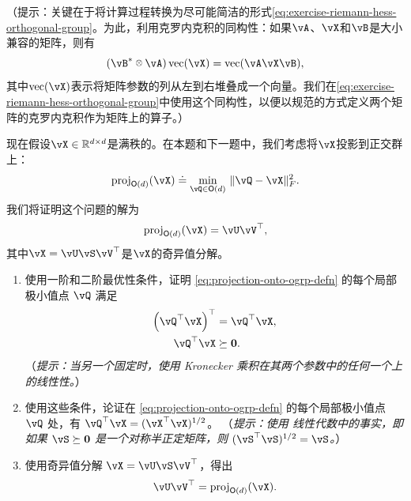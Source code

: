 \documentclass[../../book-main_zh.tex]{subfiles}
\begin{document}
（提示：关键在于将计算过程转换为尽可能简洁的形式\eqref{eq:exercise-riemann-hess-orthogonal-group}。为此，利用克罗内克积的同构性：如果$\vA$、$\vX$和$\vB$是大小兼容的矩阵，则有
        \begin{equation*}
            (\vB\adj \kron \vA) \Vec(\vX) = \Vec(\vA \vX \vB),
        \end{equation*}
        其中$\Vec(\vX)$表示将矩阵参数的列从左到右堆叠成一个向量。我们在\eqref{eq:exercise-riemann-hess-orthogonal-group}中使用这个同构性，以便以规范的方式定义两个矩阵的克罗内克积作为矩阵上的算子。）

        现在假设$\vX \in \R^{d\times d}$是满秩的。在本题和下一题中，我们考虑将$\vX$投影到正交群上：
        \begin{equation}\label{eq:projection-onto-ogrp-defn}
            \mathrm{proj}_{\O(d)}(\vX) \doteq
            \min_{\vQ \in \O(d)
            }\, \norm{\vQ - \vX}_F^2.
        \end{equation}
        我们将证明这个问题的解为
        \begin{equation*}
            \mathrm{proj}_{\O(d)}(\vX)
            =
            \vU \vV^\top,
        \end{equation*}
        其中$\vX = \vU \vS \vV^\top$是$\vX$的奇异值分解。

\begin{enumerate}
            \item 使用一阶和二阶最优性条件，证明 \eqref{eq:projection-onto-ogrp-defn} 的每个局部极小值点 $\vQ$ 满足
            \begin{align*}
                \left( \vQ^\top \vX \right)^\top &= \vQ^\top \vX, \\
                \vQ^\top \vX &\succeq \mathbf{0}.
            \end{align*}
            （\textit{提示：当另一个固定时，使用 Kronecker 乘积在其两个参数中的任何一个上的线性性。}）
            \item 使用这些条件，论证在 \eqref{eq:projection-onto-ogrp-defn} 的每个局部极小值点 $\vQ$ 处，有 $\vQ^\top \vX = (\vX^\top \vX)^{1/2}$。
            （\textit{提示：使用 %
            线性代数中的事实，即如果 $\vS \succeq \mathbf{0}$ 是一个对称半正定矩阵，则 $(\vS^\top\vS)^{1/2} = \vS$。}）
            \item 使用奇异值分解 $\vX = \vU \vS \vV^\top$，得出
            \begin{equation*}
                \vU \vV^\top
                =
                \mathrm{proj}_{\O(d)}(\vX).
            \end{equation*}
        \end{enumerate}
\end{document}

